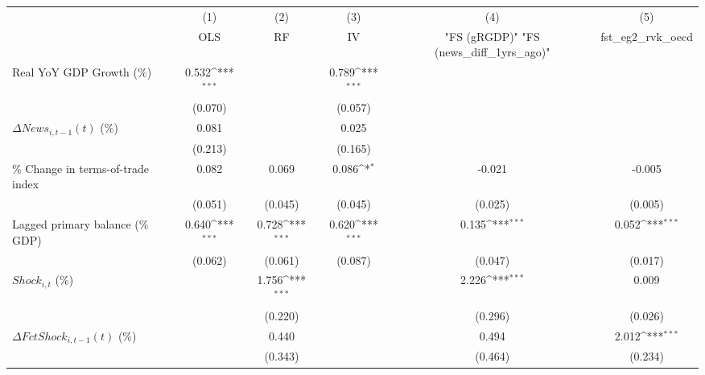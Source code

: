{
\def\sym#1{\ifmmode^{#1}\else\(^{#1}\)\fi}
\begin{tabular}{l*{5}{c}}
\toprule
                    &\multicolumn{1}{c}{(1)}&\multicolumn{1}{c}{(2)}&\multicolumn{1}{c}{(3)}&\multicolumn{1}{c}{(4)}&\multicolumn{1}{c}{(5)}\\
                    &\multicolumn{1}{c}{OLS}&\multicolumn{1}{c}{RF}&\multicolumn{1}{c}{IV}&\multicolumn{1}{c}{ "FS (gRGDP)"  "FS (news_diff_1yrs_ago)" }&\multicolumn{1}{c}{fst_eg2_rvk_oecd}\\
\midrule
Real YoY GDP Growth (\%)&       0.532\sym{***}&                     &       0.789\sym{***}&                     &                     \\
                    &     (0.070)         &                     &     (0.057)         &                     &                     \\
\addlinespace
$ \Delta News_{i,t-1}(t)$ (\%)&       0.081         &                     &       0.025         &                     &                     \\
                    &     (0.213)         &                     &     (0.165)         &                     &                     \\
\addlinespace
\% Change in terms-of-trade index&       0.082         &       0.069         &       0.086\sym{*}  &      -0.021         &      -0.005         \\
                    &     (0.051)         &     (0.045)         &     (0.045)         &     (0.025)         &     (0.005)         \\
\addlinespace
Lagged primary balance (\% GDP)&       0.640\sym{***}&       0.728\sym{***}&       0.620\sym{***}&       0.135\sym{***}&       0.052\sym{***}\\
                    &     (0.062)         &     (0.061)         &     (0.087)         &     (0.047)         &     (0.017)         \\
\addlinespace
$ Shock_{i,t}$ (\%) &                     &       1.756\sym{***}&                     &       2.226\sym{***}&       0.009         \\
                    &                     &     (0.220)         &                     &     (0.296)         &     (0.026)         \\
\addlinespace
$ \Delta FctShock_{i,t-1}(t)$ (\%)&                     &       0.440         &                     &       0.494         &       2.012\sym{***}\\
                    &                     &     (0.343)         &                     &     (0.464)         &     (0.234)         \\

\end{tabular}}
